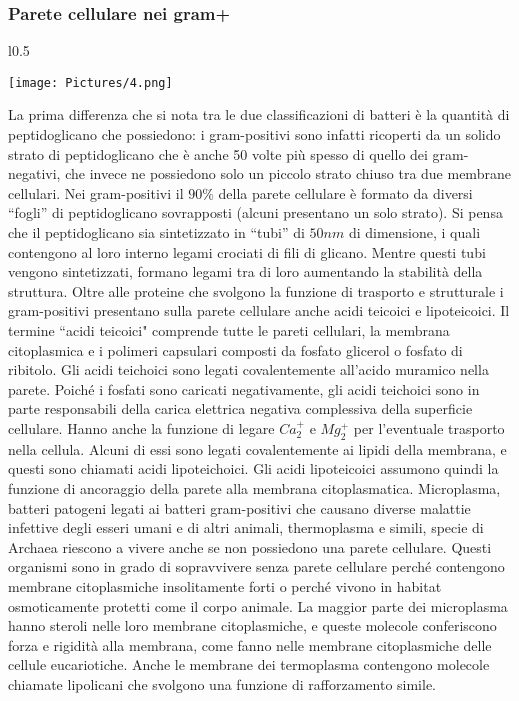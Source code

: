 \subsubsection{Parete cellulare nei gram+} 
\begin{wrapfigure}{l}{0.5\textwidth}
  \begin{center}
    \texttt{[image: Pictures/4.png]}
  \end{center}
\end{wrapfigure}
La prima differenza che si nota tra le due classificazioni di batteri è la quantità di peptidoglicano che possiedono: i gram-positivi sono infatti ricoperti da un 
solido strato di peptidoglicano che è anche 50 volte più spesso di quello dei gram-negativi, che invece ne possiedono solo un piccolo strato chiuso tra due membrane cellulari.
Nei gram-positivi il $90\%$ della parete cellulare \`e formato da diversi ``fogli” di peptidoglicano sovrapposti (alcuni presentano un solo strato). 
Si pensa che il peptidoglicano sia sintetizzato in ``tubi” di $50nm$ di dimensione, i quali contengono al 
loro interno legami crociati di fili di glicano. Mentre questi tubi vengono sintetizzati, formano legami tra di loro aumentando la stabilit\`a della struttura. 
Oltre alle proteine che svolgono la funzione di trasporto e strutturale i gram-positivi presentano sulla parete cellulare anche acidi teicoici e lipoteicoici. Il 
termine ``acidi teicoici" comprende tutte le pareti cellulari, la membrana citoplasmica e i polimeri capsulari composti da fosfato glicerol o fosfato di 
ribitolo. Gli acidi teichoici sono legati covalentemente all’acido muramico nella parete. Poiché i fosfati sono caricati negativamente, gli acidi 
teichoici sono in parte responsabili della carica elettrica negativa complessiva della superficie cellulare. Hanno anche la funzione di legare 
$Ca_2^+$ e $Mg_2^+$ per l'eventuale trasporto nella cellula. Alcuni di essi sono legati covalentemente ai lipidi della membrana, e questi sono chiamati 
acidi lipoteichoici. Gli acidi lipoteicoici assumono quindi la funzione di ancoraggio della parete alla membrana citoplasmatica. Microplasma, 
batteri patogeni legati ai batteri gram-positivi che causano diverse malattie infettive degli esseri umani e di altri animali, thermoplasma e simili, 
specie di Archaea riescono a vivere anche se non possiedono una parete cellulare. Questi organismi sono in grado di sopravvivere senza parete cellulare perché contengono 
membrane citoplasmiche insolitamente forti o perché vivono in habitat osmoticamente protetti come il corpo animale. La maggior parte dei microplasma hanno 
steroli nelle loro membrane citoplasmiche, e queste molecole conferiscono forza e rigidità alla membrana, come fanno nelle membrane citoplasmiche delle 
cellule eucariotiche. Anche le membrane dei termoplasma contengono molecole chiamate lipolicani che svolgono una funzione di rafforzamento simile.
